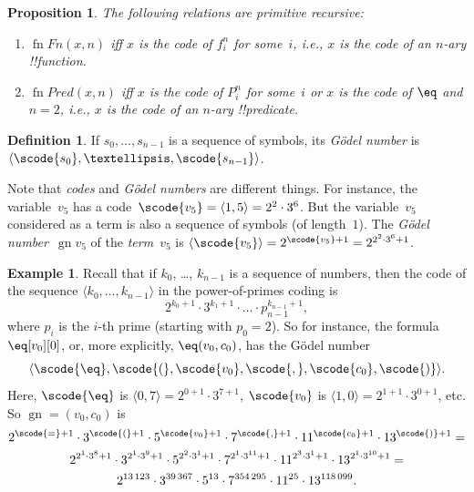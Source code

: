 \documentclass[10pt,a4paper]{article}
\theoremstyle{plain}
\newtheorem{prop}[thm]{Proposition}
\theoremstyle{definition}
\newtheorem{defn}[thm]{Definition}
\newtheorem{ex}[thm]{Example}
\theoremstyle{remark}
\newenvironment{explain}{}{}
\providecommand{\Obj}{}
\providecommand{\tuple}[1]{\langle #1 \rangle}
\providecommand{\Gn}{\operatorname{gn}}
\providecommand{\fn}{\operatorname{fn}}
\providecommand{\fn}{\operatorname{fn}}
\begin{document}
\begin{prop}
The following relations are primitive recursive:
\begin{enumerate}
\item $\fn{Fn}(x, n)$ iff $x$ is the code of $\Obj f^n_i$ for
  some~$i$, i.e., $x$ is the code of an $n$-ary !!{function}.
\item $\fn{Pred}(x, n)$ iff $x$ is the code of $\Obj P^n_i$ for
  some~$i$ or $x$ is the code of $\eq$ and $n = 2$, i.e., $x$ is the
  code of an $n$-ary !!{predicate}.
\end{enumerate}
\end{prop}

\begin{defn}
If $s_0, \dots, s_{n-1}$ is a sequence of symbols, its \emph{G\"odel
  number} is $\tuple{\scode{s_0}, \dots, \scode{s_{n-1}}}$.
\end{defn}

\begin{explain}
Note that \emph{codes} and \emph{G\"odel numbers} are different
things. For instance, the variable~$\Obj v_5$ has a code~$\scode{\Obj
  v_5} = \tuple{1, 5} = 2^2\cdot 3^6$. But the variable~$\Obj v_5$
considered as a term is also a sequence of symbols (of
length~$1$). The \emph{G\"odel number}~$\Gn{\Obj v_5}$ of the
\emph{term}~$\Obj v_5$ is $\tuple{\scode{\Obj v_5}} = 2^{\scode{\Obj
    v_5} + 1} = 2^{2^2\cdot 3^6 + 1}$.
\end{explain}

\begin{ex}
Recall that if $k_0$, \dots, $k_{n-1}$ is a sequence of numbers, then
the code of the sequence $\tuple{k_0, \dots, k_{n-1}}$ in the
power-of-primes coding is
\[
2^{k_0+1}\cdot3^{k_1+1}\cdot \dots \cdot p_{n-1}^{k_{n-1}+1},
\]
where $p_i$ is the $i$-th prime (starting with $p_0 = 2$). So for
instance, the formula $\eq[\Obj v_0][\Obj 0]$, or, more explicitly,
${\eq}(\Obj v_0,\Obj c_0)$, has the G\"odel number
\[
\tuple{\scode{\eq},\scode{(},\scode{\Obj v_0},\scode{,}, \scode{\Obj
    c_0},\scode{)}}.
\]
Here, $\scode{\eq}$ is $\tuple{0,7} = 2^{0+1}\cdot
3^{7+1}$, $\scode{\Obj v_0}$ is $\tuple{1,0} = 2^{1+1}\cdot3^{0+1}$,
etc. So $\Gn{=(\Obj v_0,\Obj c_0)}$ is
\begin{multline*}
2^{\scode{=} + 1}\cdot 3^{\scode{(}+1}\cdot 5^{\scode{\Obj v_0}+1}
\cdot 7^{\scode{,} + 1} \cdot 11^{\scode{\Obj c_0}+1} \cdot
13^{\scode{)}+1} = \\
2^{2^1\cdot 3^8 + 1}\cdot 3^{2^1\cdot 3^9+1}\cdot 5^{2^2\cdot 3^1+1}
\cdot 7^{2^1\cdot 3^{11} + 1} \cdot 11^{2^3\cdot3^1+1} \cdot
13^{2^1\cdot3^{10}+1} = \\
2^{13\,123}\cdot 3^{39\,367}\cdot 5^{13}\cdot 7^{354\,295}\cdot11^{25}\cdot13^{118\,099}.
\end{multline*}
\end{ex}
\end{document}
